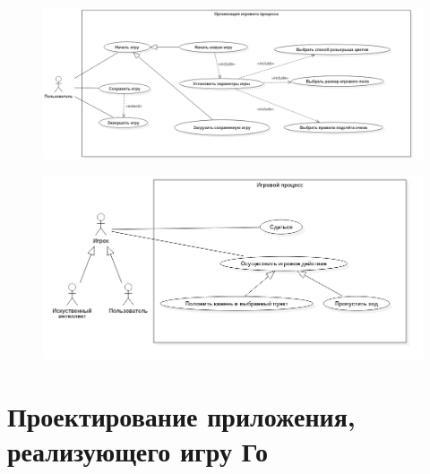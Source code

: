 \begin{figure}[H]
	\begin{center}
		\includegraphics[scale=0.65]{../UMLdiagrams/UseCase/GameOrganisation.png}
		\label{pic:GameOrganisation}
	\end{center}
\end{figure}

\begin{figure}[H]
	\begin{center}
		\includegraphics[scale=0.545]{../UMLdiagrams/UseCase/GameProcess.png}
		\label{pic:GameProcess}
	\end{center}
\end{figure}

\section*{Проектирование приложения, реализующего игру Го}



